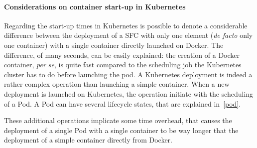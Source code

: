 \paragraph*{Considerations on container start-up in Kubernetes}
Regarding the start-up times in Kubernetes is possible to denote a considerable
difference between the deployment of a SFC with only one element
(\textit{de facto} only one container) with a single container directly launched
on Docker. The difference, of many seconds, can be easily explained: the
creation of a Docker container, \textit{per se}, is quite fast compared to the
scheduling job the Kubernetes cluster has to do before launching the pod. A
Kubernetes deployment is indeed a rather complex operation than launching a
simple container. When a new deployment is launched on Kubernetes, the operation
initiate with the scheduling of a Pod. A Pod can have several lifecycle
states, that are explained in~\ref{pod}.

These additional operations implicate some time overhead, that causes the
deployment of a single Pod with a single container to be way longer that the
deployment of a simple container directly from Docker.
